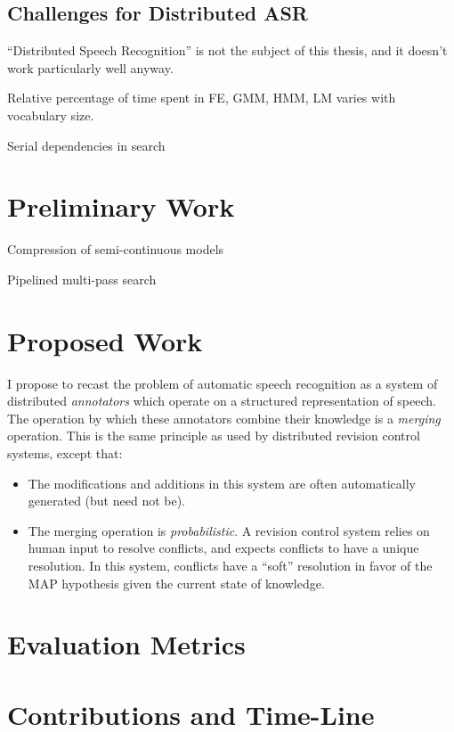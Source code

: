 \documentclass{article}
\begin{document}
\subsection{Challenges for Distributed ASR}
\label{sec:challenges}

``Distributed Speech Recognition'' is not the subject of this thesis,
and it doesn't work particularly well anyway.

Relative percentage of time spent in FE, GMM, HMM, LM varies with
vocabulary size.

Serial dependencies in search

\section{Preliminary Work}
\label{sec:prelim}

Compression of semi-continuous models

Pipelined multi-pass search

\section{Proposed Work}
\label{sec:proposed}

I propose to recast the problem of automatic speech recognition as a
system of distributed {\em annotators} which operate on a structured
representation of speech.  The operation by which these annotators
combine their knowledge is a {\em merging} operation.  This is the
same principle as used by distributed revision control systems, except
that:

\begin{itemize}
\item The modifications and additions in this system are often
  automatically generated (but need not be).
\item The merging operation is {\em probabilistic}.  A revision
  control system relies on human input to resolve conflicts, and
  expects conflicts to have a unique resolution.  In this system,
  conflicts have a ``soft'' resolution in favor of the MAP hypothesis
  given the current state of knowledge.
\end{itemize}


\section{Evaluation Metrics}
\label{sec:eval}

\section{Contributions and Time-Line}
\label{sec:contrib}



\end{document}
